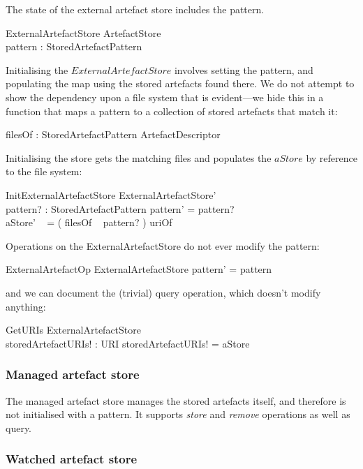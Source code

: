 \documentclass[a4paper,titlepage,twoside,12pt]{article}
\begin{document}
The state of the external artefact store includes the pattern.
\begin{schema}{ExternalArtefactStore}
	ArtefactStore	\\
	pattern : StoredArtefactPattern
\end{schema}

Initialising the $ExternalArtefactStore$ involves setting the pattern, and populating the map using the stored artefacts found there. We do not attempt to show the dependency upon a file system that is evident---we hide this in a function that maps a pattern to a collection of stored artefacts that match it:
\begin{axdef}
	filesOf : StoredArtefactPattern \pfun \power ArtefactDescriptor
\end{axdef}

Initialising the store gets the matching files and populates the $aStore$ by reference to the file system:
\begin{schema}{InitExternalArtefactStore}
	ExternalArtefactStore'	\\
	pattern? : StoredArtefactPattern
\where
	pattern' = pattern?	\\
	aStore' ~ \inv = ( filesOf ~ pattern? ) \dres uriOf 
\end{schema}

Operations on the ExternalArtefactStore do not ever modify the pattern:
\begin{schema}{ExternalArtefactOp}
	\Delta ExternalArtefactStore
\where
	pattern' = pattern
\end{schema}
and we can document the (trivial) query operation, which doesn't modify anything:
\begin{schema}{GetURIs}
	\Xi ExternalArtefactStore	\\
	storedArtefactURIs! : \power URI
\where
	storedArtefactURIs! = \dom aStore
\end{schema}

\subsubsection{Managed artefact store}
The managed artefact store manages the stored artefacts itself, and therefore is not initialised with a pattern. It supports \emph{store} and \emph{remove} operations as well as query.

\subsubsection{Watched artefact store}
\end{document}
